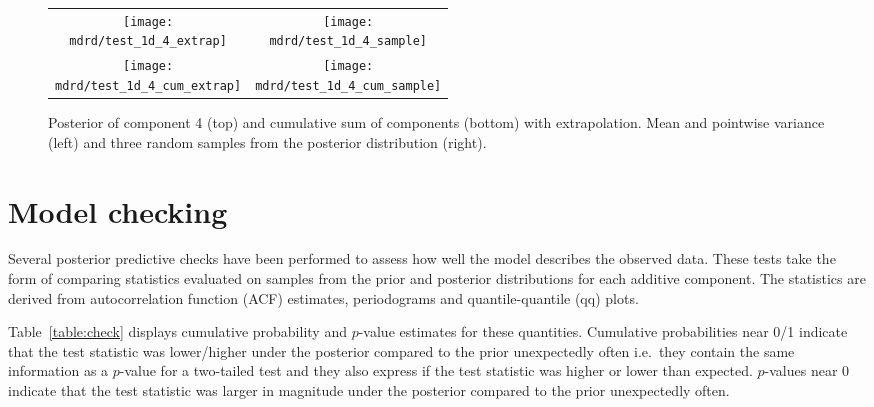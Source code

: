 \documentclass{article} %
\def\ie{i.e.\ }
\begin{document}


\begin{figure}[H]
\newcommand{\wmgd}{0.5\columnwidth}
\newcommand{\hmgd}{3.0cm}
\newcommand{\mdrd}{test_1d}
\newcommand{\mbm}{\hspace{-0.3cm}}
\begin{tabular}{cc}
\mbm \texttt{[image: \\mdrd/test\_1d\_4\_extrap]} & \texttt{[image: \\mdrd/test\_1d\_4\_sample]} \\
\mbm \texttt{[image: \\mdrd/test\_1d\_4\_cum\_extrap]} & \texttt{[image: \\mdrd/test\_1d\_4\_cum\_sample]}
\end{tabular}
\caption{Posterior of component 4 (top) and cumulative sum of components (bottom) with extrapolation. Mean and pointwise variance (left) and three random samples from the posterior distribution (right).}
\label{fig:extrap4}
\end{figure}

\section{Model checking}
\label{sec:check}

Several posterior predictive checks have been performed to assess how well the model describes the observed data.
These tests take the form of comparing statistics evaluated on samples from the prior and posterior distributions for each additive component.
The statistics are derived from autocorrelation function (ACF) estimates, periodograms and quantile-quantile (qq) plots.

Table~\ref{table:check} displays cumulative probability and $p$-value estimates for these quantities.
Cumulative probabilities near 0/1 indicate that the test statistic was lower/higher under the posterior compared to the prior unexpectedly often \ie they contain the same information as a $p$-value for a two-tailed test and they also express if the test statistic was higher or lower than expected.
$p$-values near 0 indicate that the test statistic was larger in magnitude under the posterior compared to the prior unexpectedly often.
\end{document}
